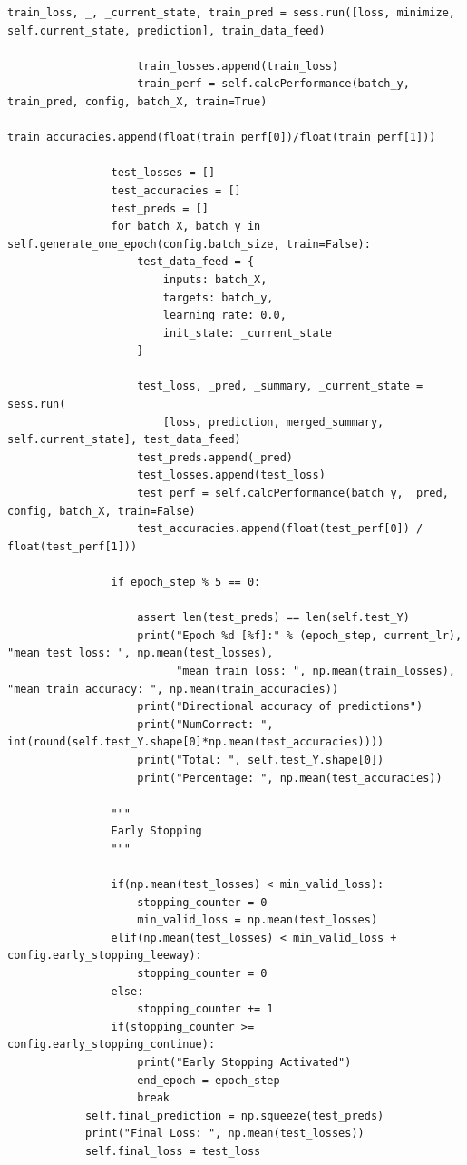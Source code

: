 \documentclass[12pt,a4paper,twoside,openright]{report}
\begin{document}
\begin{lstlisting}[caption={A snippet of simplified \texttt{Python} code for the LSTM Network's main function},captionpos=b,label={lst:NB}]
                    train_loss, _, _current_state, train_pred = sess.run([loss, minimize, self.current_state, prediction], train_data_feed)

                    train_losses.append(train_loss)
                    train_perf = self.calcPerformance(batch_y, train_pred, config, batch_X, train=True)
                    train_accuracies.append(float(train_perf[0])/float(train_perf[1]))

                test_losses = []
                test_accuracies = []
                test_preds = []
                for batch_X, batch_y in self.generate_one_epoch(config.batch_size, train=False):
                    test_data_feed = {
                        inputs: batch_X,
                        targets: batch_y,
                        learning_rate: 0.0,
                        init_state: _current_state
                    }

                    test_loss, _pred, _summary, _current_state = sess.run(
                        [loss, prediction, merged_summary, self.current_state], test_data_feed)
                    test_preds.append(_pred)
                    test_losses.append(test_loss)
                    test_perf = self.calcPerformance(batch_y, _pred, config, batch_X, train=False)
                    test_accuracies.append(float(test_perf[0]) / float(test_perf[1]))

                if epoch_step % 5 == 0:

                    assert len(test_preds) == len(self.test_Y)
                    print("Epoch %d [%f]:" % (epoch_step, current_lr), "mean test loss: ", np.mean(test_losses),
                          "mean train loss: ", np.mean(train_losses), "mean train accuracy: ", np.mean(train_accuracies))
                    print("Directional accuracy of predictions")
                    print("NumCorrect: ", int(round(self.test_Y.shape[0]*np.mean(test_accuracies))))
                    print("Total: ", self.test_Y.shape[0])
                    print("Percentage: ", np.mean(test_accuracies))

                """
                Early Stopping
                """

                if(np.mean(test_losses) < min_valid_loss):
                    stopping_counter = 0
                    min_valid_loss = np.mean(test_losses)
                elif(np.mean(test_losses) < min_valid_loss + config.early_stopping_leeway):
                    stopping_counter = 0
                else:
                    stopping_counter += 1
                if(stopping_counter >= config.early_stopping_continue):
                    print("Early Stopping Activated")
                    end_epoch = epoch_step
                    break
            self.final_prediction = np.squeeze(test_preds)
            print("Final Loss: ", np.mean(test_losses))
            self.final_loss = test_loss


\end{lstlisting}
\end{document}
